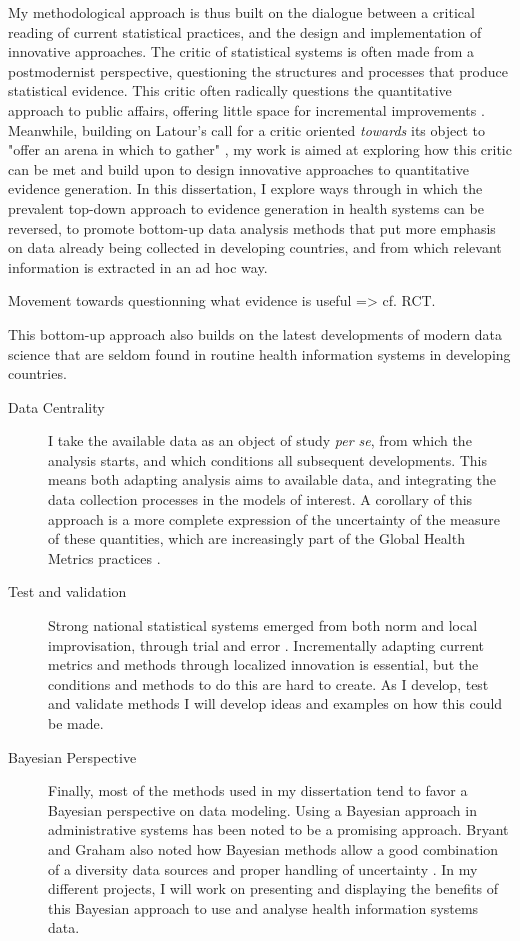 My methodological approach is thus built on the dialogue between a critical reading of current statistical practices, and the design and implementation of innovative approaches. The critic of statistical systems is often made from a postmodernist perspective, questioning the structures and processes that produce statistical evidence. This critic  often radically questions the quantitative approach to public affairs, offering little space for incremental improvements \citep{rottenburg_world_2016}. Meanwhile, building on Latour's call for a critic oriented \textit{towards} its object to "offer an arena in which to gather" \citep{latour_why_2004}, my work is aimed at exploring how this critic can be met and build upon to design innovative approaches to quantitative evidence generation. In this dissertation, I explore ways through in which the prevalent top-down approach to evidence generation in health systems can be reversed, to promote bottom-up data analysis methods that put more emphasis on data already being collected in developing countries, and from which relevant information is extracted in an ad hoc way.

Movement towards questionning what evidence is useful => cf. RCT.

This bottom-up approach also builds on the latest developments of modern data science that are seldom found in routine health information systems in developing countries.

\begin{description}
\item[Data Centrality] I take the available data as an object of study \textit{per se}, from which the analysis starts, and which conditions all subsequent developments. This means both adapting analysis aims to available data, and integrating the data collection processes in the models of interest. A corollary of this approach is a more complete expression of the uncertainty of the measure of these quantities, which are increasingly part of the Global Health Metrics practices \citep{murray_towards_2007}.
\item[Test and validation] Strong national statistical systems emerged from both norm and local improvisation, through trial and error \citep{lecuyer_medecins_1987,chaperon_information_1988}. Incrementally adapting current metrics and  methods through localized innovation is essential, but the conditions and methods to do this are hard to create. As I develop, test and validate methods I will develop ideas and examples on how this could be made.
\item[Bayesian Perspective] Finally, most of the methods used in my dissertation tend to favor a Bayesian perspective on data modeling. Using a Bayesian approach in administrative systems has been noted to be a promising approach\citep{fienberg_bayesian_2011,little_calibrated_2012}. Bryant and Graham also noted how Bayesian methods allow a good combination of a diversity data sources and proper handling of uncertainty \citep{bryant_bayesian_2013}. In my different projects, I will work on presenting and displaying the benefits of this Bayesian approach to use and analyse health information systems data.
\end{description}


